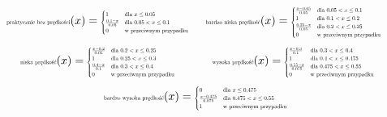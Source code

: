 \documentclass{article}
\begin{document}
\begin{equation*}
\begin{minipage}{0.5\textwidth}
\centering
$\text{\scalebox{0.5}{praktycznie bez prędkości}}(x) =
\scalebox{0.5}{$
\begin{cases}
1 & \text{dla } x \leq 0.05 \\
\frac{0.1 - x}{0.05} & \text{dla } 0.05 < x \leq 0.1 \\
0 & \text{w przeciwnym przypadku}
\end{cases}
$}$
\end{minipage}%
\begin{minipage}{0.5\textwidth}
\centering
$\text{\scalebox{0.5}{bardzo niska prędkość}}(x) =
\scalebox{0.5}{$
\begin{cases}
\frac{x - 0.05}{0.05} & \text{dla } 0.05 < x \leq 0.1 \\
1 & \text{dla } 0.1 < x \leq 0.2 \\
\frac{0.25 - x}{0.05} & \text{dla } 0.2 < x \leq 0.25 \\
0 & \text{w przeciwnym przypadku}
\end{cases}
$}$
\end{minipage}
\end{equation*}
\begin{equation*}
\begin{minipage}{0.5\textwidth}
\centering
$\text{\scalebox{0.5}{niska prędkość}}(x) =
\scalebox{0.5}{$
\begin{cases}
\frac{x - 0.2}{0.05} & \text{dla } 0.2 < x \leq 0.25 \\
1 & \text{dla } 0.25 < x \leq 0.3 \\
\frac{0.4 - x}{0.1} & \text{dla } 0.3 < x \leq 0.4 \\
0 & \text{w przeciwnym przypadku}
\end{cases}
$}$
\end{minipage}%
\begin{minipage}{0.5\textwidth}
\centering
$\text{\scalebox{0.5}{wysoka prędkość}}(x) =
\scalebox{0.5}{$
\begin{cases}
\frac{x - 0.3}{0.1} & \text{dla } 0.3 < x \leq 0.4 \\
1 & \text{dla } 0.4 < x \leq 0.475 \\
\frac{0.55 - x}{0.075} & \text{dla } 0.475 < x \leq 0.55 \\
0 & \text{w przeciwnym przypadku}
\end{cases}
$}$
\end{minipage}
\end{equation*}
\begin{equation*}
\text{\scalebox{0.5}{bardzo wysoka prędkość}}(x) =
\scalebox{0.5}{$
\begin{cases}
0 & \text{dla } x \leq 0.475 \\
\frac{x - 0.475}{0.075} & \text{dla } 0.475 < x \leq 0.55 \\
1 & \text{w przeciwnym przypadku}
\end{cases}
$}
\end{equation*}
\end{document}
